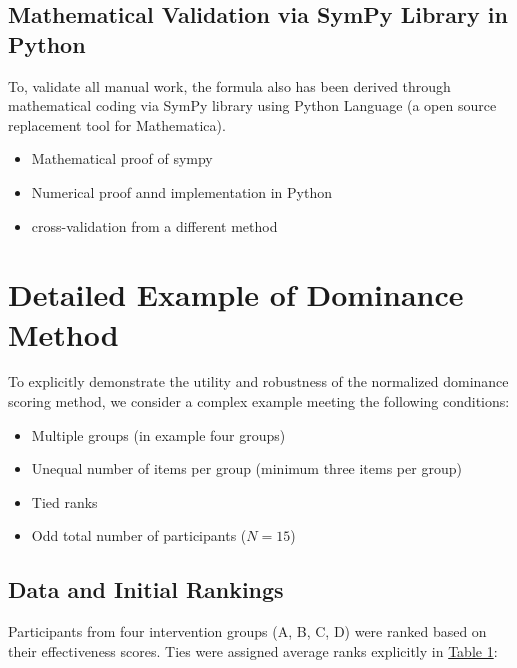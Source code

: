 \documentclass[man,floatsintext]{apa7}
\begin{document}
\subsection{Mathematical Validation via SymPy Library in Python}
To, validate all manual work, the formula also has been derived through mathematical coding via SymPy library using Python Language (a open source replacement tool for Mathematica).

\begin{itemize}
    \item Mathematical proof of sympy
    \item Numerical proof annd implementation in Python 
    \item cross-validation from a different method
\end{itemize}

\section{Detailed Example of Dominance Method}

To explicitly demonstrate the utility and robustness of the normalized dominance scoring method, we consider a complex example meeting the following conditions:
\begin{itemize}
    \item Multiple groups (in example four groups)
    \item Unequal number of items per group (minimum three items per group)
    \item Tied ranks
    \item Odd total number of participants ($N=15$)
\end{itemize}

\subsection{Data and Initial Rankings}

Participants from four intervention groups (A, B, C, D) were ranked based on their effectiveness scores. Ties were assigned average ranks explicitly in \hyperref[initial-data]{Table 1}:
\end{document}
